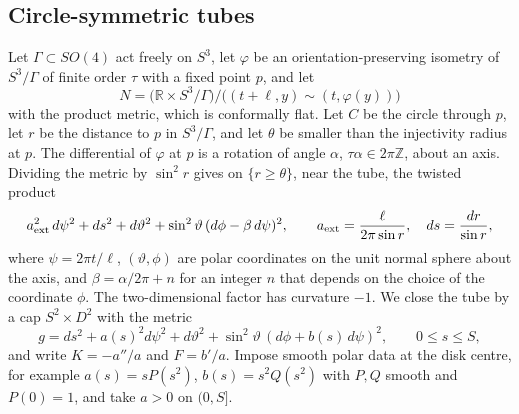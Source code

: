 \documentclass[11pt,letterpaper]{article}
\numberwithin{equation}{section}
\theoremstyle{definition}
\begin{document}
\subsection{Circle-symmetric tubes}
Let \(\Gamma\subset SO(4)\) act freely on \(S^3\), let \(\varphi\) be an
orientation-preserving isometry of \(S^3/\Gamma\) of finite order \(\tau\) with a fixed point
\(p\), and let
\[
 N=\bigl(\mathbb R\times S^3/\Gamma\bigr)\big/\bigl((t+\ell,y)\sim(t,\varphi(y))\bigr)
\]
with the product metric, which is conformally flat. Let \(C\) be the
circle through \(p\), let \(r\) be the distance to \(p\) in \(S^3/\Gamma\),
and let \(\theta\) be smaller than the injectivity radius at \(p\). The
differential of \(\varphi\) at \(p\) is a rotation of angle \(\alpha\),
\(\tau\alpha\in2\pi\mathbb Z\), about an axis. Dividing the metric by
\(\sin^2r\) gives on \(\{r\ge\theta\}\), near the tube, the twisted product
\begin{equation}\label{eq:exterior}
 a_{\rm ext}^2\,d\psi^2+ds^2+d\vartheta^2+\sin^2\vartheta\,(d\phi-\beta\,d\psi)^2,
 \qquad a_{\rm ext}=\frac{\ell}{2\pi\sin r},\quad ds=\frac{dr}{\sin r},
\end{equation}
where \(\psi=2\pi t/\ell\), \((\vartheta,\phi)\) are polar coordinates on
the unit normal sphere about the axis, and \(\beta=\alpha/2\pi+n\) for an
integer \(n\) that depends on the choice of the coordinate \(\phi\). The
two-dimensional factor has curvature \(-1\). We close the tube by a cap
\(S^2\times D^2\) with the metric
\begin{equation}\label{eq:cap}
 g=ds^2+a(s)^2d\psi^2+d\vartheta^2+\sin^2\vartheta\,(d\phi+b(s)\,d\psi)^2,
 \qquad 0\le s\le S,
\end{equation}
and write \(K=-a''/a\) and \(F=b'/a\). Impose smooth polar data at the disk centre, for example
\(a(s)=sP(s^2)\), \(b(s)=s^2Q(s^2)\) with \(P,Q\) smooth and \(P(0)=1\),
and take \(a>0\) on \((0,S]\).
\end{document}
